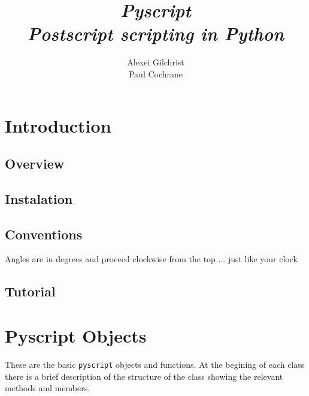 \documentclass[a4paper]{book}
\begin{document}
\title{{\Huge \emph{Pyscript}}\\[1cm]
\emph{Postscript scripting in Python}\\[3cm]}

\author{Alexei Gilchrist\\
Paul Cochrane\\[3cm]}

\maketitle

\tableofcontents

\chapter{Introduction}
\label{cha:introduction}


\section{Overview}


\section{Instalation}
\label{sec:instalation}


\section{Conventions}
\label{sec:conventions}


Angles are in degrees and proceed clockwise from the top ... just
like your clock


\section{Tutorial}
\label{sec:tutotial}


\chapter{Pyscript Objects}
\label{cha:base-objects}

These are the basic \Verb|pyscript| objects and functions. At the begining
of each class there is a brief description of the structure of the class
showing the relevant methods and members.
\end{document}
